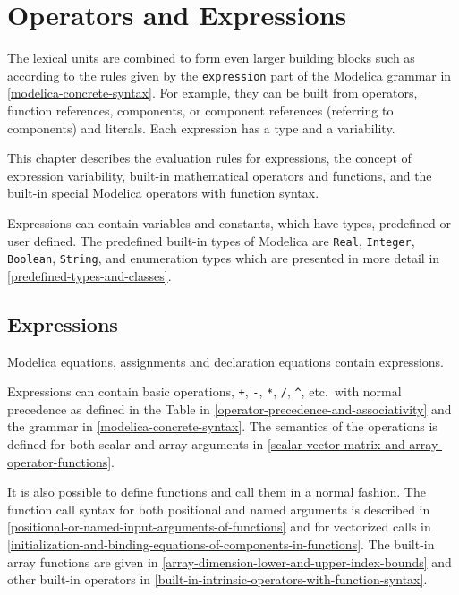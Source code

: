 \chapter{Operators and Expressions}\label{operators-and-expressions}

The lexical units are combined to form even larger building blocks such as  according to the rules given by the \lstinline[language=grammar]!expression! part of the Modelica grammar in \cref{modelica-concrete-syntax}.
For example, they can be built from operators, function references, components, or component references (referring to components) and literals.
Each expression has a type and a variability.

This chapter describes the evaluation rules for expressions, the concept
of expression variability, built-in mathematical operators and
functions, and the built-in special Modelica operators with function
syntax.

Expressions can contain variables and constants, which have types,
predefined or user defined. The predefined built-in types of Modelica
are \lstinline!Real!, \lstinline!Integer!, \lstinline!Boolean!, \lstinline!String!, and enumeration types which are
presented in more detail in \cref{predefined-types-and-classes}.

\section{Expressions}\label{expressions}

Modelica equations, assignments and declaration equations contain
expressions.

Expressions can contain basic operations, \lstinline!+!, \lstinline!-!, \lstinline!*!, \lstinline!/!, \lstinline!^!, etc.\ with
normal precedence as defined in the Table in \cref{operator-precedence-and-associativity} and the grammar
in \cref{modelica-concrete-syntax}. The semantics of the operations is defined for both
scalar and array arguments in \cref{scalar-vector-matrix-and-array-operator-functions}.

It is also possible to define functions and call them in a normal
fashion. The function call syntax for both positional and named
arguments is described in \cref{positional-or-named-input-arguments-of-functions} and for vectorized calls in
\cref{initialization-and-binding-equations-of-components-in-functions}. The built-in array functions are given in \cref{array-dimension-lower-and-upper-index-bounds}
and other built-in operators in \cref{built-in-intrinsic-operators-with-function-syntax}.


